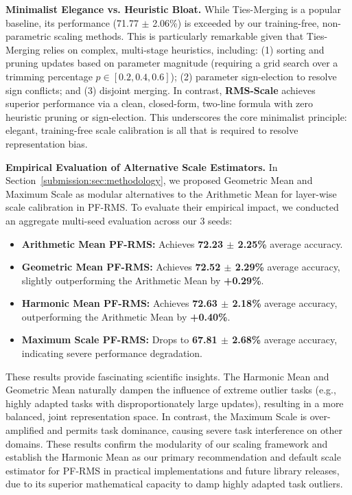 \textbf{Minimalist Elegance vs. Heuristic Bloat.}
While Ties-Merging is a popular baseline, its performance (71.77 $\pm$ 2.06\%) is exceeded by our training-free, non-parametric scaling methods. This is particularly remarkable given that Ties-Merging relies on complex, multi-stage heuristics, including: (1) sorting and pruning updates based on parameter magnitude (requiring a grid search over a trimming percentage $p \in [0.2, 0.4, 0.6]$); (2) parameter sign-election to resolve sign conflicts; and (3) disjoint merging. In contrast, \textbf{RMS-Scale} achieves superior performance via a clean, closed-form, two-line formula with zero heuristic pruning or sign-election. This underscores the core minimalist principle: elegant, training-free scale calibration is all that is required to resolve representation bias.

\textbf{Empirical Evaluation of Alternative Scale Estimators.}
In Section~\ref{submission:sec:methodology}, we proposed Geometric Mean and Maximum Scale as modular alternatives to the Arithmetic Mean for layer-wise scale calibration in PF-RMS. To evaluate their empirical impact, we conducted an aggregate multi-seed evaluation across our 3 seeds:
\begin{itemize}
    \item \textbf{Arithmetic Mean PF-RMS:} Achieves \textbf{72.23 $\pm$ 2.25\%} average accuracy.
    \item \textbf{Geometric Mean PF-RMS:} Achieves \textbf{72.52 $\pm$ 2.29\%} average accuracy, slightly outperforming the Arithmetic Mean by \textbf{+0.29\%}.
    \item \textbf{Harmonic Mean PF-RMS:} Achieves \textbf{72.63 $\pm$ 2.18\%} average accuracy, outperforming the Arithmetic Mean by \textbf{+0.40\%}.
    \item \textbf{Maximum Scale PF-RMS:} Drops to \textbf{67.81 $\pm$ 2.68\%} average accuracy, indicating severe performance degradation.
\end{itemize}
These results provide fascinating scientific insights. The Harmonic Mean and Geometric Mean naturally dampen the influence of extreme outlier tasks (e.g., highly adapted tasks with disproportionately large updates), resulting in a more balanced, joint representation space. In contrast, the Maximum Scale is over-amplified and permits task dominance, causing severe task interference on other domains. These results confirm the modularity of our scaling framework and establish the Harmonic Mean as our primary recommendation and default scale estimator for PF-RMS in practical implementations and future library releases, due to its superior mathematical capacity to damp highly adapted task outliers.

